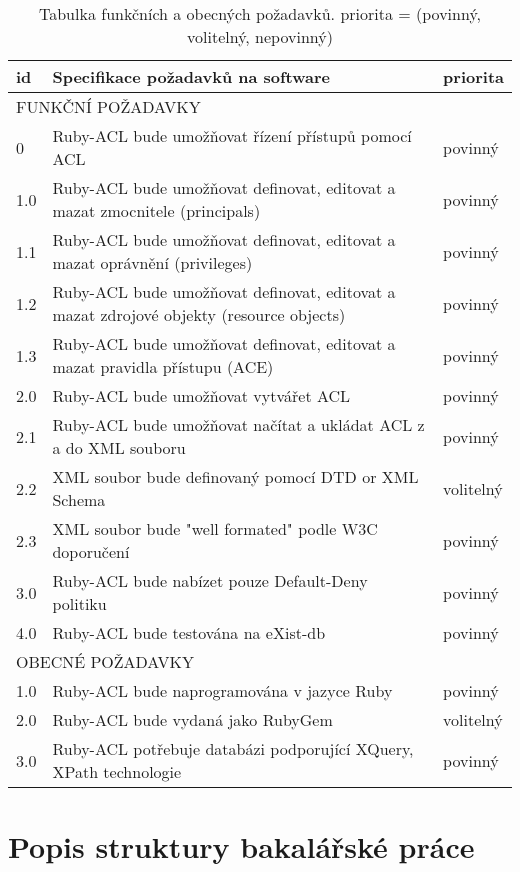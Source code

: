 \begin{table}%
\begin{center}
\begin{tabular}{|l|p{9cm}|l|}
\hline
\textbf{id} & \textbf{Specifikace požadavků na software} & \textbf{priorita} \\
\hline
\multicolumn{3}{|l|}{FUNKČNÍ POŽADAVKY} \\
\hline
0 & Ruby-ACL bude umožňovat řízení přístupů pomocí ACL & povinný\\
\hline
1.0 & Ruby-ACL bude umožňovat definovat, editovat a mazat zmocnitele (principals) & povinný\\
\hline
1.1 & Ruby-ACL bude umožňovat definovat, editovat a mazat oprávnění (privileges) & povinný\\
\hline
1.2 & Ruby-ACL bude umožňovat definovat, editovat a mazat  zdrojové objekty (resource objects) & povinný\\
\hline
1.3 & Ruby-ACL bude umožňovat definovat, editovat a mazat pravidla přístupu (ACE) & povinný\\
\hline
2.0 & Ruby-ACL bude umožňovat vytvářet ACL & povinný\\
\hline
2.1 & Ruby-ACL bude umožňovat načítat a ukládat ACL z a do XML souboru & povinný\\
\hline
2.2 & XML soubor bude definovaný pomocí DTD or XML Schema & volitelný\\
\hline
2.3 & XML soubor bude "well formated" podle W3C doporučení & povinný\\
\hline
3.0 & Ruby-ACL bude nabízet pouze Default-Deny politiku & povinný\\
\hline
4.0 & Ruby-ACL bude testována na eXist-db & povinný\\
\hline
\multicolumn{3}{|l|}{OBECNÉ POŽADAVKY} \\
\hline
1.0 & Ruby-ACL bude naprogramována v jazyce Ruby & povinný \\
\hline
2.0 & Ruby-ACL bude vydaná jako RubyGem & volitelný\\
\hline
3.0 & Ruby-ACL potřebuje databázi podporující XQuery, XPath technologie & povinný\\
\hline
\end{tabular}
\end{center}
\caption{Tabulka funkčních a obecných požadavků. priorita = (povinný, volitelný, nepovinný)}
\label{tab:tab1}
\end{table}

\section{Popis struktury bakalářské práce}

